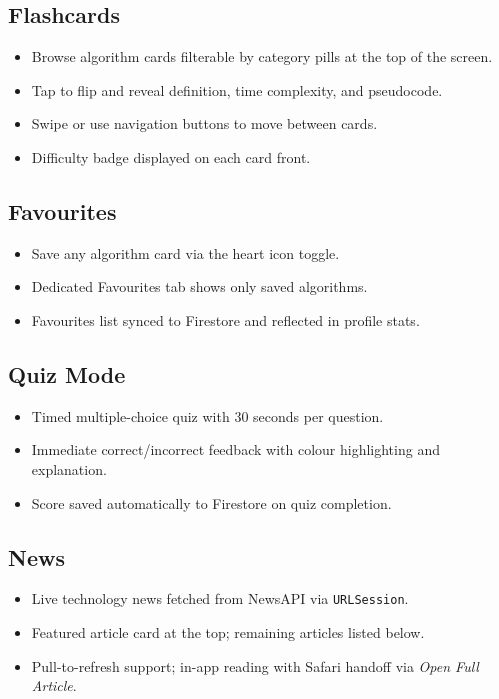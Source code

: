 \documentclass[12pt,a4paper]{article}
\begin{document}
\subsection*{Flashcards}

\begin{itemize}[leftmargin=1.5em, itemsep=3pt]
  \item Browse algorithm cards filterable by category pills at the top of the screen.
  \item Tap to flip and reveal definition, time complexity, and pseudocode.
  \item Swipe or use navigation buttons to move between cards.
  \item Difficulty badge displayed on each card front.
\end{itemize}

\subsection*{Favourites}

\begin{itemize}[leftmargin=1.5em, itemsep=3pt]
  \item Save any algorithm card via the heart icon toggle.
  \item Dedicated Favourites tab shows only saved algorithms.
  \item Favourites list synced to Firestore and reflected in profile stats.
\end{itemize}

\subsection*{Quiz Mode}

\begin{itemize}[leftmargin=1.5em, itemsep=3pt]
  \item Timed multiple-choice quiz with 30 seconds per question.
  \item Immediate correct/incorrect feedback with colour highlighting and explanation.
  \item Score saved automatically to Firestore on quiz completion.
\end{itemize}

\subsection*{News}

\begin{itemize}[leftmargin=1.5em, itemsep=3pt]
  \item Live technology news fetched from NewsAPI via \texttt{URLSession}.
  \item Featured article card at the top; remaining articles listed below.
  \item Pull-to-refresh support; in-app reading with Safari handoff via \emph{Open Full Article}.
\end{itemize}
\end{document}
